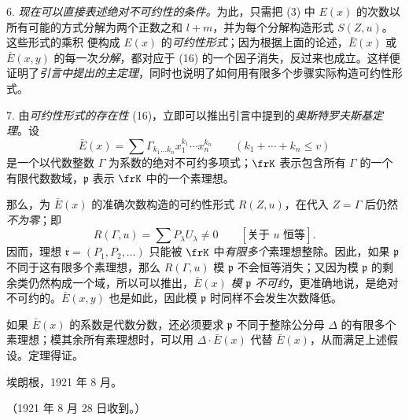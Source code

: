 6. \emph{现在可以直接表述绝对不可约性的条件。}为此，只需把 (3) 中 $E(x)$ 的次数以所有可能的方式分解为两个正数之和 $l+m$，并为每个分解构造形式 $S(Z,u)$。这些形式的乘积
便构成 $E(x)$ 的\emph{可约性形式}；因为根据上面的论述，$\bar E(x)$ 或 $\bar E(x,y)$ 的每一次\emph{分解}，都对应于 (16) 的一个因子消失，反过来也成立。这样便证明了\emph{引言中提出的主定理}，同时也说明了如何用有限多个步骤实际构造可约性形式。

7. 由\emph{可约性形式的存在性} (16)，立即可以推出引言中提到的\emph{奥斯特罗夫斯基定理}。设
\[
 \bar E(x)=\sum \Gamma_{k_1\ldots k_n}x_1^{k_1}\cdots x_n^{k_n}
 \qquad(k_1+\cdots+k_n\le v)
\]
是一个以代数整数 $\Gamma$ 为系数的绝对不可约多项式；$\frK$ 表示包含所有 $\Gamma$ 的一个有限代数数域，$\mathfrak p$ 表示 $\frK$ 中的一个素理想。

那么，为 $\bar E(x)$ 的准确次数构造的可约性形式 $R(Z,u)$，在代入 $Z=\Gamma$ 后仍然\emph{不为零}；即
\[
 R(\Gamma,u)=\sum P_\lambda U_\lambda\ne0\qquad[\text{关于 }u\text{ 恒等}].
\]
因而，理想 $\mathfrak r=(P_1,P_2,\ldots)$ 只能被 $\frK$ 中\emph{有限多个}素理想整除。因此，如果 $\mathfrak p$ 不同于这有限多个素理想，那么 $R(\Gamma,u)$ 模 $\mathfrak p$ 不会恒等消失；又因为模 $\mathfrak p$ 的剩余类仍然构成一个域，所以可以推出，$\bar E(x)$ \emph{模 $\mathfrak p$ 不可约}，更准确地说，是绝对不可约的。$\bar E(x,y)$ 也是如此，因此模 $\mathfrak p$ 时同样不会发生次数降低。

如果 $\bar E(x)$ 的系数是代数分数，还必须要求 $\mathfrak p$ 不同于整除公分母 $\Delta$ 的有限多个素理想；模其余所有素理想时，可以用 $\Delta\cdot\bar E(x)$ 代替 $\bar E(x)$，从而满足上述假设。定理得证。

\begin{flushleft}
埃朗根，1921 年 8 月。
\end{flushleft}
\begin{center}
（1921 年 8 月 28 日收到。）
\end{center}

\clearpage
